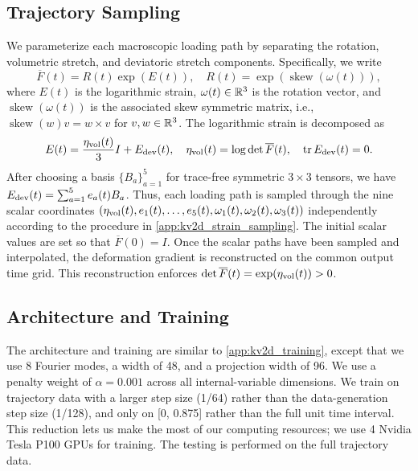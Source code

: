 \subsection{Trajectory Sampling}\label{app:cp3d_loading_sampling}
We parameterize each macroscopic loading path by separating the rotation, volumetric stretch, and deviatoric stretch components. Specifically, we write
\begin{equation*}
    \overline F(t)=R(t)\exp(E(t)),
    \quad
    R(t)=\exp(\operatorname{skew}(\omega(t))),
\end{equation*}
where $E(t)$ is the logarithmic strain, $\omega(t)\in\mathbb{R}^3$ is the rotation vector, and {$\operatorname{skew}(\omega(t))$} is the associated skew symmetric matrix, i.e., $\operatorname{skew}(w)v=w\times v$ for $v,w\in\mathbb{R}^3$. The logarithmic strain is decomposed as
\begin{equation*}
    E(t)=\frac{\eta_{\rm vol}(t)}{3}I+E_{\rm dev}(t),
    \quad
    \eta_{\rm vol}(t)=\log\det\overline F(t),
    \quad
    \operatorname{tr}E_{\rm dev}(t)=0.
\end{equation*}
After choosing a basis $\{B_a\}_{a=1}^{5}$ for trace-free symmetric $3\times3$ tensors, we have $E_{\rm dev}(t)=\sum_{a=1}^{5}e_a(t)B_a$.
Thus, each loading path is sampled through the nine scalar coordinates $\left(\eta_{\rm vol}(t),e_1(t),\dots,e_5(t), \omega_1(t),\omega_2(t),\omega_3(t)\right)$
independently according to the procedure in \cref{app:kv2d_strain_sampling}. The initial scalar values are set so that $\overline F(0)=I$. Once the scalar paths have been sampled and interpolated, the deformation gradient is reconstructed on the common output time grid. This reconstruction enforces $\det\overline F(t)=\exp(\eta_{\rm vol}(t))>0$.

\subsection{Architecture and Training}\label{app:cp_training}
The architecture and training are similar to \cref{app:kv2d_training}, except that we use 8 Fourier modes, a width of 48, and a projection width of 96. We use a penalty weight of $\alpha=0.001$ across all internal-variable dimensions. We train on trajectory data with a larger step size (1/64) rather than the data-generation step size (1/128), and only on [0, 0.875] rather than the full unit time interval. This reduction lets us make the most of our computing resources; we use 4 Nvidia Tesla P100 GPUs for training. The testing is performed on the full trajectory data.

